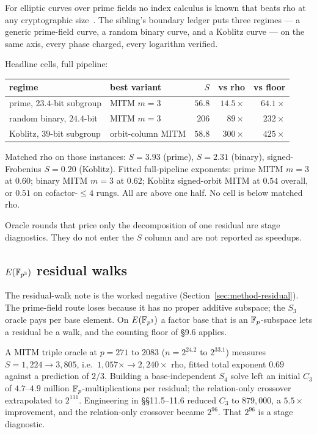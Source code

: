 For elliptic curves over prime fields no index calculus is known that
beats rho at any cryptographic size~\cite{semaev2004,gaudry2009,diem2011}.
The sibling's boundary ledger puts three regimes --- a generic
prime-field curve, a random binary curve, and a Koblitz curve --- on
the same axis, every phase charged, every logarithm
verified.

Headline cells, full pipeline:

\begin{center}
\small
\begin{tabular}{@{}llrrr@{}}
\toprule
regime & best variant & $S$ & vs rho & vs floor \\
\midrule
prime, $23.4$-bit subgroup & MITM $m=3$ & $56.8$ & $14.5\times$ & $64.1\times$ \\
random binary, $24.4$-bit & MITM $m=3$ & $206$ & $89\times$ & $232\times$ \\
Koblitz, $39$-bit subgroup & orbit-column MITM & $58.8$ & $300\times$ & $425\times$ \\
\bottomrule
\end{tabular}
\end{center}

Matched rho on those instances: $S=3.93$ (prime), $S=2.31$ (binary),
signed-Frobenius $S=0.20$ (Koblitz). Fitted full-pipeline exponents:
prime MITM $m=3$ at $0.60$; binary MITM $m=3$ at $0.62$; Koblitz
signed-orbit MITM at $0.54$ overall, or $0.51$ on cofactor-${}\le 4$
rungs. All are above one half. No cell is below matched rho.

Oracle rounds that price only the decomposition of one residual are
stage diagnostics. They do not enter the $S$ column and are not
reported as speedups.

\subsection{\texorpdfstring{$E(\mathbb{F}_{p^3})$ residual walks}{E(F_p^3) residual walks}}
\label{sec:ic-cubic}

The residual-walk note is the worked negative
(Section~\ref{sec:method-residual}). The prime-field route loses
because it has no proper additive subspace; the $S_3$ oracle pays per
base element. On $E(\mathbb{F}_{p^3})$ a factor base that is an
$\mathbb{F}_p$-subspace lets a residual be a walk, and the counting floor of
§9.6 applies.

A MITM triple oracle at $p=271$ to $2083$ ($n=2^{24.2}$ to $2^{33.1}$)
measures $S=1{,}224\to 3{,}805$, i.e.\ $1{,}057\times\to 2{,}240\times$
rho, fitted total exponent $0.69$ against a prediction of $2/3$.
Building a base-independent $S_4$ solve left an initial $C_3$ of
$4.7$--$4.9$ million $\mathbb{F}_p$-multiplications per residual; the
relation-only crossover extrapolated to $2^{111}$. Engineering in
§§11.5--11.6 reduced $C_3$ to $879{,}000$, a $5.5\times$ improvement,
and the relation-only crossover became $2^{96}$. That $2^{96}$ is a
stage diagnostic.

